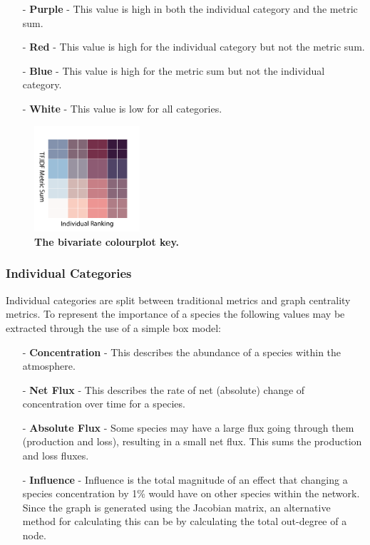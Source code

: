 \begin{itemize}
\item[-] \textbf{Purple} - This value is high in both the individual category and the metric sum. 
\item[-] \textbf{Red} - This value is high for the individual category but not the metric sum. 
\item[-] \textbf{Blue} - This value is high for the metric sum but not the individual category. 
\item[-] \textbf{White} - This value is low for all categories. 
\end{itemize}



\begin{figure}[H]
     \centering
         \includegraphics[width=0.35\textwidth,angle=45]{figures_c3/mlpregressor/cbar.pdf}
        \caption{ \textbf{The bivariate colourplot key.} }
        \label{fig:cmap}
\end{figure}


\subsubsection{Individual Categories}
Individual categories are split between traditional metrics and graph centrality metrics. To represent the importance of a species the following values may be extracted through the use of a simple box model:

\begin{itemize}
\item[-] \textbf{Concentration} - This describes the abundance of a species within the atmosphere. 
\item[-] \textbf{Net Flux} - This describes the rate of net (absolute) change of concentration over time for a species. 
\item[-] \textbf{Absolute Flux} - Some species may have a large flux going through them (production and loss), resulting in a small net flux. This sums the production and loss fluxes. 
\item[-] \textbf{Influence} - Influence is the total magnitude of an effect that changing a species concentration by 1\% would have on other species within the network. Since the graph is generated using the Jacobian matrix, an alternative method for calculating this can be by calculating the total out-degree of a node.  
\end{itemize}



